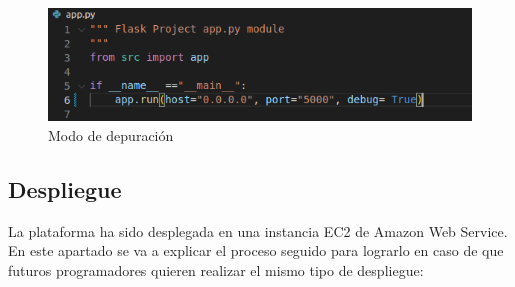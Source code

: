 \begin{figure}[H]
    \centering
    \includegraphics[scale=0.9]{img/imgs-memoria/DebugOn.PNG}
    \caption{Modo de depuración}
\end{figure}

\subsection{Despliegue}
La plataforma ha sido desplegada en una instancia EC2 de Amazon Web Service. En este apartado se va a explicar el proceso seguido para lograrlo en caso de que futuros programadores quieren realizar el mismo tipo de despliegue:

